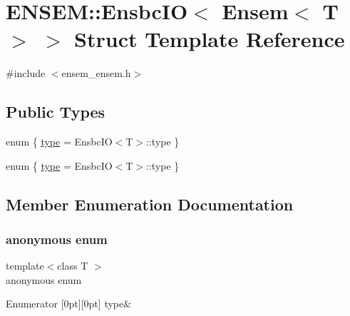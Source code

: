 \hypertarget{structENSEM_1_1EnsbcIO_3_01Ensem_3_01T_01_4_01_4}{}\section{E\+N\+S\+EM\+:\+:Ensbc\+IO$<$ Ensem$<$ T $>$ $>$ Struct Template Reference}
\label{structENSEM_1_1EnsbcIO_3_01Ensem_3_01T_01_4_01_4}


{\ttfamily \#include $<$ensem\+\_\+ensem.\+h$>$}

\subsection*{Public Types}
\begin{DoxyCompactItemize}
\item 
enum \{ \mbox{\hyperlink{structENSEM_1_1EnsbcIO_3_01Ensem_3_01T_01_4_01_4_ac4789ded6d044ac8640f0c3e7c7559bea69aac019e5c8434d1fa6bc1587dfec89}{type}} = Ensbc\+IO$<$T$>$\+:\+:type
 \}
\item 
enum \{ \mbox{\hyperlink{structENSEM_1_1EnsbcIO_3_01Ensem_3_01T_01_4_01_4_ac4789ded6d044ac8640f0c3e7c7559bea69aac019e5c8434d1fa6bc1587dfec89}{type}} = Ensbc\+IO$<$T$>$\+:\+:type
 \}
\end{DoxyCompactItemize}


\subsection{Member Enumeration Documentation}
\mbox{\label{structENSEM_1_1EnsbcIO_3_01Ensem_3_01T_01_4_01_4_adf14e7314773c56b138fb1ba417a9696}} 
\subsubsection{\texorpdfstring{anonymous enum}{anonymous enum}}
{\footnotesize\ttfamily template$<$class T $>$ \\
anonymous enum}

\begin{DoxyEnumFields}{Enumerator}
[0pt][0pt]{}\mbox{\label{structENSEM_1_1EnsbcIO_3_01Ensem_3_01T_01_4_01_4_ac4789ded6d044ac8640f0c3e7c7559bea69aac019e5c8434d1fa6bc1587dfec89}} 
type&\\
\hline

\end{DoxyEnumFields}
\mbox{\label{structENSEM_1_1EnsbcIO_3_01Ensem_3_01T_01_4_01_4_ac4789ded6d044ac8640f0c3e7c7559be}} 
